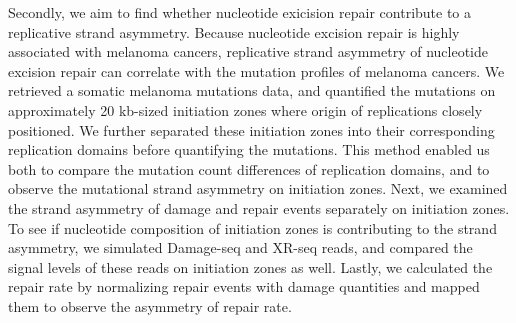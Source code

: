 Secondly, we aim to find whether nucleotide exicision repair contribute to a replicative strand asymmetry. Because nucleotide excision repair is highly associated with melanoma cancers, replicative strand asymmetry of nucleotide excision repair can correlate with the mutation profiles of melanoma cancers. We retrieved a somatic melanoma mutations data, and quantified the mutations on approximately 20 kb-sized initiation zones where origin of replications closely positioned. We further separated these initiation zones into their corresponding replication domains before quantifying the mutations. This method enabled us both to compare the mutation count differences of replication domains, and to observe the mutational strand asymmetry on initiation zones. Next, we examined the strand asymmetry of damage and repair events separately on initiation zones. To see if nucleotide composition of initiation zones is contributing to the strand asymmetry, we simulated Damage-seq and XR-seq reads, and compared the signal levels of these reads on initiation zones as well. Lastly, we calculated the repair rate by normalizing repair events with damage quantities and mapped them to observe the asymmetry of repair rate.